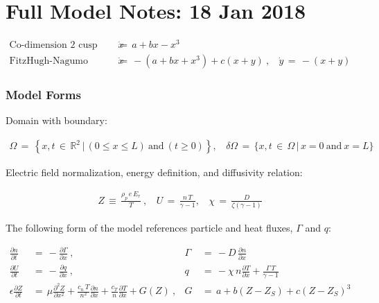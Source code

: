 \documentclass[a4paper,8pt]{article}
\date{}
\begin{document}
\section{Full Model Notes: 18 Jan
2018}\label{full-model-notes-18-jan-2018}

\small

\begin{align}
    \text{Co-dimension 2 cusp bifurcation:} ~~~~ \dot{x} \,&=\, a + bx - x^3 \\
    \text{FitzHugh-Nagumo bifurcation:} ~~~~ \dot{x} \,&=\, -(a + bx + x^3) + c(x + y)~, ~~~~ \dot{y} \,=\, -(x + y)
\end{align}

\normalsize

\subsubsection{Model Forms}\label{model-forms}

Domain with boundary: \small

\begin{align}
    \Omega \,=\, \left\{x, t \,\in\, \mathbb{R}^2 \,|\, (0 \leq x \leq L) ~\text{and}~ (t \geq 0)\right\}, ~~~~ \delta\Omega \,=\, \{x, t \,\in\, \Omega \,|\, x = 0 ~\text{and}~ x = L \}
\end{align}

\normalsize

Electric field normalization, energy definition, and diffusivity
relation: \small

\begin{align}
    Z \,\equiv\, \frac{\rho_p \, e \, E_r}{T}~, ~~~~ U \,=\, \frac{n\,T}{\gamma - 1}, ~~~~ \chi \,=\, \frac{D}{\zeta(\gamma - 1)}
\end{align}

\normalsize

The following form of the model references particle and heat fluxes,
\(\Gamma\) and \(q\): \small

\begin{align}
    \frac{\partial n}{\partial t} \,&=\, -\frac{\partial \Gamma}{\partial x}~, &\Gamma \,&=\, -D \, \frac{\partial n}{\partial x} \\
    \frac{\partial U}{\partial t} \,&=\, -\frac{\partial q}{\partial x}~, &q \,&=\, -\chi \, n \frac{\partial T}{\partial x} + \frac{\Gamma\,T}{\gamma - 1} \\
    \epsilon \frac{\partial Z}{\partial t} \,&=\, \mu \frac{\partial^2 Z}{\partial x^2} + \frac{c_n \, T}{n^2} \frac{\partial n}{\partial x} + \frac{c_T}{n} \frac{\partial T}{\partial x} + G(Z)~, &G \,&=\, a + b(Z - Z_S) + c(Z - Z_S)^3
\end{align}
\end{document}
